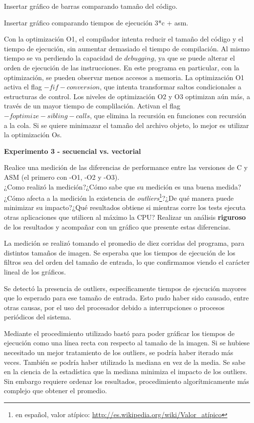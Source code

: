Insertar gráfico de barras comparando tamaño del código.

Insertar gráfico comparando tiempos de ejecución 3*c + asm.

Con la optimización O1, el compilador intenta reducir el tamaño del código y el tiempo de ejecución, sin aumentar demasiado el tiempo de
compilación. Al mismo tiempo se va perdiendo la capacidad de $debugging$, ya que se puede alterar el orden de ejecución de las instrucciones.
En este programa en particular, con la optimización, se pueden observar menos accesos a memoria. La optimización O1 activa el flag 
$-fif-conversion$, que intenta transformar saltos condicionales a estructuras de control.
Los niveles de optimización O2 y O3 optimizan aún más, a través de un mayor tiempo de complilación. Activan el flag $-foptimize-sibling-calls$,
que elimina la recursión en funciones con recursión a la cola. Si se quiere minimazar el tamaño del archivo objeto, lo mejor es utilizar la
optimización Os.

\vspace*{0.3cm} \noindent
\textbf{Experimento 3 - secuencial vs. vectorial}

	Realice una medición de las diferencias de performance entre las versiones
	de C y ASM (el primero con -O1, -O2 y -O3).\\
	¿Como realizó la medición?¿Cómo sabe que su medición es una buena medida?¿Cómo afecta a la medición la existencia de \emph{outliers}\footnote{en español, valor atípico: \url{http://es.wikipedia.org/wiki/Valor_atípico}}?¿De qué manera puede minimizar su impacto?¿Qué resultados obtiene si mientras corre los tests ejecuta otras aplicaciones que utilicen al máximo la CPU? 
	Realizar un análisis \textbf{riguroso} de los resultados y acompañar con un gráfico que presente estas diferencias.


La medición se realizó tomando el promedio de diez corridas del programa, para distintos tamaños de imagen. Se esperaba que los tiempos de
ejecución de los filtros sea del orden del tamaño de entrada, lo que confirmamos viendo el carácter lineal de los gráficos.

Se detectó la presencia de outliers, específicamente tiempos de ejecución mayores que lo esperado para ese tamaño de entrada. Esto pudo haber
sido causado, entre otras causas, por el uso del procesador debido a interrupciones o procesos periódicos del sistema.

Mediante el procedimiento utilizado bastó para poder gráficar los tiempos de ejecución como una línea recta con respecto al tamaño de la imagen.
Si se hubiese necesitado un mejor tratamiento de los outliers, se podría haber iterado más veces. También se podría haber utilizado la mediana en
vez de la media. Se sabe en la ciencia de la estadística que la mediana minimiza el impacto de los outliers. Sin embargo requiere ordenar los
resultados, procedimiento algorítmicamente más complejo que obtener el promedio.


